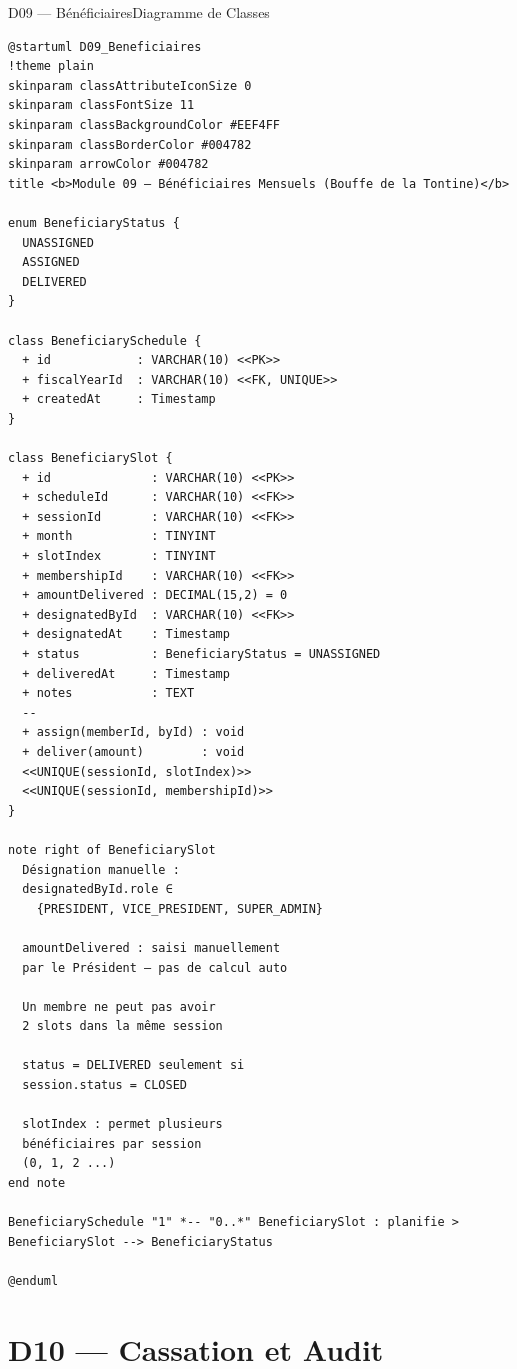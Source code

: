\documentclass[12pt, a4paper]{report}
\begin{document}
\begin{diagramBox}{D09 — Bénéficiaires}{Diagramme de Classes}
\begin{lstlisting}
@startuml D09_Beneficiaires
!theme plain
skinparam classAttributeIconSize 0
skinparam classFontSize 11
skinparam classBackgroundColor #EEF4FF
skinparam classBorderColor #004782
skinparam arrowColor #004782
title <b>Module 09 — Bénéficiaires Mensuels (Bouffe de la Tontine)</b>

enum BeneficiaryStatus {
  UNASSIGNED
  ASSIGNED
  DELIVERED
}

class BeneficiarySchedule {
  + id            : VARCHAR(10) <<PK>>
  + fiscalYearId  : VARCHAR(10) <<FK, UNIQUE>>
  + createdAt     : Timestamp
}

class BeneficiarySlot {
  + id              : VARCHAR(10) <<PK>>
  + scheduleId      : VARCHAR(10) <<FK>>
  + sessionId       : VARCHAR(10) <<FK>>
  + month           : TINYINT
  + slotIndex       : TINYINT
  + membershipId    : VARCHAR(10) <<FK>>
  + amountDelivered : DECIMAL(15,2) = 0
  + designatedById  : VARCHAR(10) <<FK>>
  + designatedAt    : Timestamp
  + status          : BeneficiaryStatus = UNASSIGNED
  + deliveredAt     : Timestamp
  + notes           : TEXT
  --
  + assign(memberId, byId) : void
  + deliver(amount)        : void
  <<UNIQUE(sessionId, slotIndex)>>
  <<UNIQUE(sessionId, membershipId)>>
}

note right of BeneficiarySlot
  Désignation manuelle :
  designatedById.role ∈
    {PRESIDENT, VICE_PRESIDENT, SUPER_ADMIN}

  amountDelivered : saisi manuellement
  par le Président — pas de calcul auto

  Un membre ne peut pas avoir
  2 slots dans la même session

  status = DELIVERED seulement si
  session.status = CLOSED

  slotIndex : permet plusieurs
  bénéficiaires par session
  (0, 1, 2 ...)
end note

BeneficiarySchedule "1" *-- "0..*" BeneficiarySlot : planifie >
BeneficiarySlot --> BeneficiaryStatus

@enduml
\end{lstlisting}
\end{diagramBox}

\section{D10 — Cassation et Audit}
\end{document}
